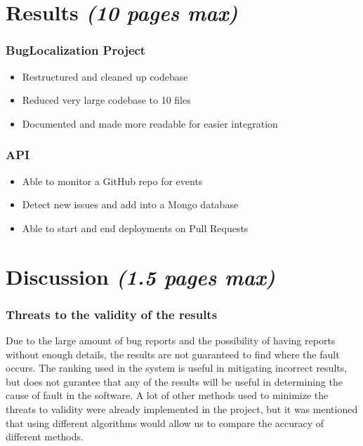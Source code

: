 \documentclass[12pt]{article}
\providecommand{\tightlist}{%
  \setlength{\itemsep}{0pt}\setlength{\parskip}{0pt}}
\begin{document}
\hypertarget{results-10-pages-max}{%
\section{\texorpdfstring{Results \emph{(10 pages
max)}}{Results (10 pages max)}}\label{results-10-pages-max}}

\hypertarget{buglocalization-project}{%
\subsubsection{BugLocalization Project}\label{buglocalization-project}}

\begin{itemize}
\tightlist
\item
  Restructured and cleaned up codebase
\item
  Reduced very large codebase to 10 files
\item
  Documented and made more readable for easier integration
\end{itemize}

\hypertarget{api}{%
\subsubsection{API}\label{api}}

\begin{itemize}
\tightlist
\item
  Able to monitor a GitHub repo for events
\item
  Detect new issues and add into a Mongo database
\item
  Able to start and end deployments on Pull Requests
\end{itemize}

\hypertarget{discussion-1.5-pages-max}{%
\section{\texorpdfstring{Discussion \emph{(1.5 pages
max)}}{Discussion (1.5 pages max)}}\label{discussion-1.5-pages-max}}

\hypertarget{threats-to-the-validity-of-the-results}{%
\subsubsection{Threats to the validity of the
results}\label{threats-to-the-validity-of-the-results}}

Due to the large amount of bug reports and the possibility of having
reports without enough details, the results are not guaranteed to find
where the fault occurs. The ranking used in the system is useful in
mitigating incorrect results, but does not gurantee that any of the
results will be useful in determining the cause of fault in the
software. A lot of other methods used to minimize the threats to
validity were already implemented in the project, but it was mentioned
that using different algorithms would allow us to compare the accuracy
of different methods.
\end{document}
